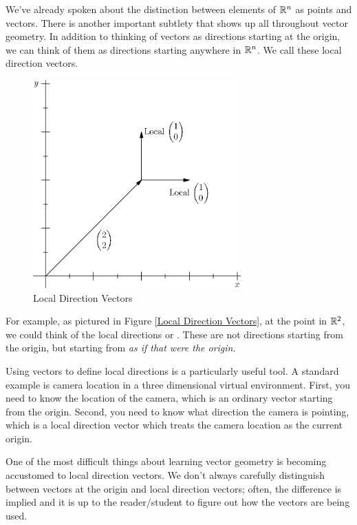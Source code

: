 \documentclass[fleqn]{report}
\begin{document}
We've already spoken about the distinction between elements of
$\mathbb{R}^n$ as points and vectors. There is another important
subtlety that shows up all throughout vector geometry. In
addition to thinking of vectors as directions starting at the
origin, we can think of them as directions starting anywhere
in $\mathbb{R}^n$. We call these local direction vectors.

\begin{figure}[t]
\centering
\includegraphics[width=8cm]{figure8.eps}
\caption{Local Direction Vectors}
\label{Local Direction Vectors}
\end{figure}

For example, as pictured in Figure \ref{Local Direction
Vectors}, at the point  in $\mathbb{R}^2$,
we could think of the local directions
 or
. These
are not directions starting from the origin, but starting from
 \emph{as if that were the
origin}. 

Using vectors to define local directions is a particularly
useful tool. A standard example is camera location in a three
dimensional virtual environment. First, you need to know the
location of the camera, which is an ordinary vector starting
from the origin. Second, you need to know what direction the
camera is pointing, which is a local direction vector which
treats the camera location as the current origin.

One of the most difficult things about learning vector geometry
is becoming accustomed to local direction vectors. We don't
always carefully distinguish between vectors at the origin and
local direction vectors; often, the difference is implied and
it is up to the reader/student to figure out how the vectors
are being used. 
\end{document}
